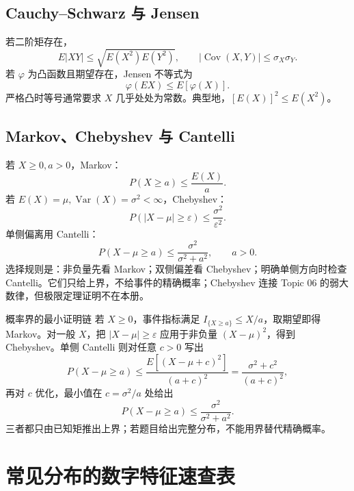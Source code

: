 \documentclass[11pt,a4paper]{ctexart}
\begin{document}
\subsection{Cauchy--Schwarz 与 Jensen}

若二阶矩存在，
\[
E\lvert XY\rvert\leq\sqrt{E(X^2)E(Y^2)},\qquad \lvert\operatorname{Cov}(X,Y)\rvert\leq\sigma_X\sigma_Y.
\]
若 $\varphi$ 为凸函数且期望存在，Jensen 不等式为
\[
\boxed{\varphi(EX)\leq E[\varphi(X)]}.
\]
严格凸时等号通常要求 $X$ 几乎处处为常数。典型地，$[E(X)]^2\leq E(X^2)$。

\subsection{Markov、Chebyshev 与 Cantelli}

若 $X\geq0,a>0$，Markov：
\[
\boxed{P(X\geq a)\leq\frac{E(X)}a}.
\]
若 $E(X)=\mu,\operatorname{Var}(X)=\sigma^2<\infty$，Chebyshev：
\[
\boxed{P(\lvert X-\mu\rvert\geq\varepsilon)\leq\frac{\sigma^2}{\varepsilon^2}}.
\]
单侧偏离用 Cantelli：
\[
\boxed{P(X-\mu\geq a)\leq\frac{\sigma^2}{\sigma^2+a^2}},\qquad a>0.
\]
选择规则是：非负量先看 Markov；双侧偏差看 Chebyshev；明确单侧方向时检查 Cantelli。它们只给上界，不给事件的精确概率；Chebyshev 连接 Topic 06 的弱大数律，但极限定理证明不在本册。

\begin{methodbox}{概率界的最小证明链}
若 $X\ge0$，事件指标满足 $I_{\{X\ge a\}}\le X/a$，取期望即得 Markov。对一般 $X$，把 $\lvert X-\mu\rvert\ge\varepsilon$ 应用于非负量 $(X-\mu)^2$，得到 Chebyshev。单侧 Cantelli 则对任意 $c>0$ 写出
\[
P(X-\mu\ge a)\le\frac{E[(X-\mu+c)^2]}{(a+c)^2}
=\frac{\sigma^2+c^2}{(a+c)^2},
\]
再对 $c$ 优化，最小值在 $c=\sigma^2/a$ 处给出
\[
P(X-\mu\ge a)\le\frac{\sigma^2}{\sigma^2+a^2}.
\]
三者都只由已知矩推出上界；若题目给出完整分布，不能用界替代精确概率。
\end{methodbox}

\section{常见分布的数字特征速查表}
\end{document}
